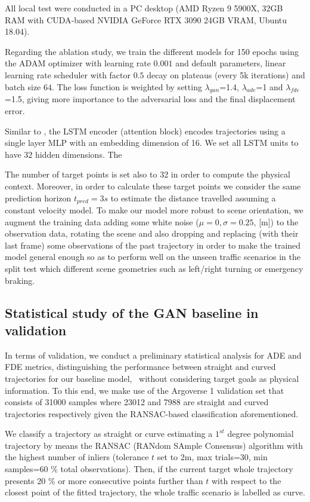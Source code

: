 All local test were conducted in a PC desktop (AMD Ryzen 9 5900X, 32GB RAM with \ac{CUDA}-based NVIDIA GeForce RTX 3090 24GB VRAM, Ubuntu 18.04).

Regarding the ablation study, we train the different models for 150 epochs using the \ac{ADAM} optimizer with learning rate $0.001$ and default parameters, linear learning rate scheduler with factor $0.5$ decay on plateaus (every 5k iterations) and batch size $64$. The loss function is weighted by setting $\lambda_{gan}$=1.4, $\lambda_{ade}$=1 and $\lambda_{fde}$=1.5, giving more importance to the adversarial loss and the final displacement error. 

Similar to \cite{sadeghian2019sophie}, the \ac{LSTM} encoder (attention block) encodes trajectories using a single layer \ac{MLP} with an embedding dimension of 16. We set all \ac{LSTM} units to have $32$ hidden dimensions. The 

The number of target points is set also to 32 in order to compute the physical context. Moreover, in order to calculate these target points we consider the same prediction horizon $t_{pred}=3s$ to estimate the distance travelled assuming a constant velocity model. To make our model more robust to scene orientation, we augment the training data adding some white noise ($\mu=0, \sigma=0.25$, [m]) to the observation data, rotating the scene and also dropping and replacing (with their last frame) some observations of the past trajectory in order to make the trained model general enough so as to perform well on the unseen traffic scenarios in the split test which different scene geometries such as left/right turning or emergency braking.%

\subsection{Statistical study of the \ac{GAN} baseline in validation}
\label{subsec:5_target_agent_distribution}

In terms of validation, we conduct a preliminary statistical analysis for \ac{ADE} and \ac{FDE} metrics, distinguishing the performance between straight and curved trajectories for our baseline model, \ie \ without considering target goals as physical information. To this end, we make use of the Argoverse 1 validation set that consists of 31000 samples where 23012 and 7988 are straight and curved trajectories respectively given the RANSAC-based classification aforementioned.

We classify a trajectory as straight or curve estimating a $1^{st}$ degree polynomial trajectory by means the RANSAC (RANdom SAmple Consensus) algorithm with the highest number of inliers (tolerance $t$ set to 2m, max trials=30, min samples=60 \% total observations). Then, if the current target whole trajectory presents 20 \% or more consecutive points further than $t$ with respect to the closest point of the fitted trajectory, the whole traffic scenario is labelled as curve. 

